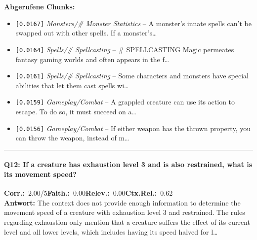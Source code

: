 \noindent\textbf{Abgerufene Chunks:}
\begin{itemize}[noitemsep, topsep=2pt]
  \item[\textbf{\#1}] \texttt{[0.0167]} \textit{Monsters/# Monster Statistics} -- A monster's innate spells can't be swapped out with other spells. If a monster's\ldots
  \item[\textbf{\#2}] \texttt{[0.0164]} \textit{Spells/# Spellcasting} -- \# SPELLCASTING  Magic permeates fantasy gaming worlds and often appears in the f\ldots
  \item[\textbf{\#3}] \texttt{[0.0161]} \textit{Spells/# Spellcasting} -- Some characters and monsters have special abilities that let them cast spells wi\ldots
  \item[\textbf{\#4}] \texttt{[0.0159]} \textit{Gameplay/Combat} -- A grappled creature can use its action to escape. To do so, it must succeed on a\ldots
  \item[\textbf{\#5}] \texttt{[0.0156]} \textit{Gameplay/Combat} -- If either weapon has the thrown property, you can throw the weapon, instead of m\ldots
\end{itemize}
\vspace{4pt}
\hrule
\vspace{6pt}

\paragraph{Q12: If a creature has exhaustion level 3 and is also restrained, what is its movement speed?}
\noindent \textbf{Corr.:}~2.00/5\quad \textbf{Faith.:}~0.00\quad \textbf{Relev.:}~0.00\quad \textbf{Ctx.Rel.:}~0.62\\

\noindent\textbf{Antwort:} The context does not provide enough information to determine the movement speed of a creature with exhaustion level 3 and restrained. The rules regarding exhaustion only mention that a creature suffers the effect of its current level and all lower levels, which includes having its speed halved for l\ldots

